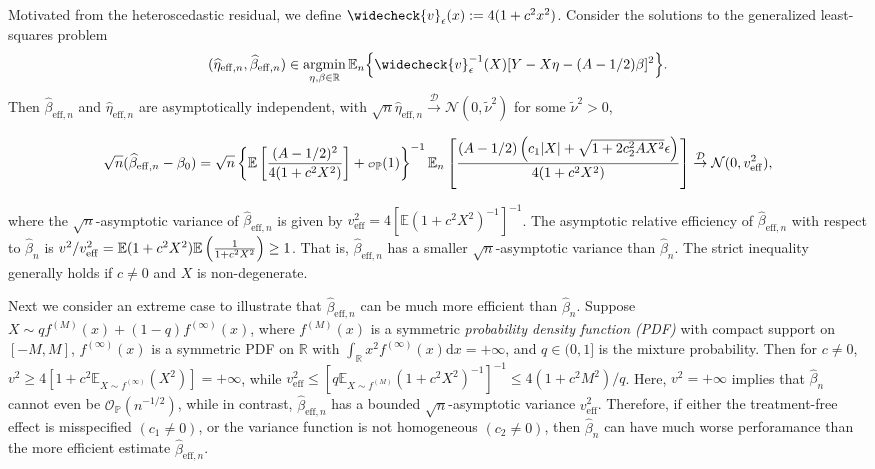 \documentclass[11pt]{article}
\theoremstyle{definition}
\theoremstyle{remark}
\newcommand{\bbE}{\mathbb{E}}
\newcommand{\bbP}{\mathbb{P}}
\newcommand{\bbR}{\mathbb{R}}
\newcommand{\cD}{\mathcal{D}}
\newcommand{\cN}{\mathcal{N}}
\newcommand{\cO}{\mathcal{O}}
\newcommand\smallcO{
	\mathchoice
	{{\scriptscriptstyle\mathcal{O}}}%
	{{\scriptscriptstyle\mathcal{O}}}%
	{{\scriptscriptstyle\mathcal{O}}}%
	{\scalebox{.5}{$\scriptscriptstyle\mathcal{O}$}}%
}
\newcommand{\argmin}{\mathop{\mathrm{argmin}}}
\newcommand{\rd}{\mathrm{d}}
\newcommand{\eff}{\mathrm{eff}}
\begin{document}
Motivated from the heteroscedastic residual, we define $ \widecheck{v}_{\epsilon}(x) := 4(1 + c^{2}x^{2}) $. Consider the solutions to the generalized least-squares problem
\begin{align}
	(\widehat{\eta}_{\eff,n},\widehat{\beta}_{\eff,n}) \in \argmin_{\eta,\beta \in \bbR}\bbE_{n}\Big\{ \widecheck{v}_{\epsilon}^{-1}(X)[Y - X\eta - (A-1/2)\beta]^{2}\Big\}.\label{eq:eg_gls}
\end{align}
Then $ \widehat{\beta}_{\eff,n} $ and $ \widehat{\eta}_{\eff,n} $ are asymptotically independent, with $ \sqrt{n}\widehat{\eta}_{\eff,n} \stackrel{\cD}{\to} \cN(0,\widetilde{\nu}^{2}) $ for some $ \widetilde{\nu}^{2} > 0 $,
\begin{small}
	\[ \sqrt{n}(\widehat{\beta}_{\eff,n} - \beta_{0}) = \sqrt{n}\left\{ \bbE\left[ {(A-1/2)^{2} \over 4(1 + c^{2}X^{2})} \right] + \smallcO_{\bbP}(1) \right\}^{-1}\bbE_{n}\left[ {(A-1/2)\left( c_{1}|X| + \sqrt{1+2c_{2}^{2}AX^{2}}\epsilon \right) \over 4(1 + c^{2}X^{2})} \right] \stackrel{\cD}{\to} \cN(0,v_{\eff}^{2}), \]
\end{small}%
where the $ \sqrt{n} $-asymptotic variance of $ \widehat{\beta}_{\eff,n} $ is given by $ v_{\eff}^{2} = 4\left[\bbE(1 + c^{2}X^{2})^{-1}\right]^{-1} $.
The asymptotic relative efficiency of $ \widehat{\beta}_{\eff,n} $ with respect to $ \widehat{\beta}_{n} $ is $ {v^{2}/v_{\eff}^{2}} = \bbE(1+c^{2}X^{2})\bbE\left(  {1 \over 1 + c^{2}X^{2}}  \right) \ge 1 $.
That is, $ \widehat{\beta}_{\eff,n} $ has a smaller $ \sqrt{n} $-asymptotic variance than $ \widehat{\beta}_{n} $. The strict inequality generally holds if $ c \ne 0 $ and $ X $ is non-degenerate. 

Next we consider an extreme case to illustrate that $ \widehat{\beta}_{\eff,n} $ can be much more efficient than $ \widehat{\beta}_{n} $. Suppose $ X \sim qf^{(M)}(x) + (1-q)f^{(\infty)}(x) $, where $ f^{(M)}(x) $ is a symmetric \textit{probability density function (PDF)} with compact support on $ [-M,M] $, $ f^{(\infty)}(x) $ is a symmetric PDF on $ \bbR $ with $ \int_{\bbR} x^{2}f^{(\infty)}(x)\rd x = +\infty $, and $ q \in (0,1] $ is the mixture probability. Then for $ c \ne 0 $, $ v^{2} \ge 4[1+c^{2}\bbE_{X \sim f^{(\infty)}}(X^{2})] = +\infty $, while $ v_{\eff}^{2} \le \left[ q\bbE_{X \sim f^{(M)}}(1+c^{2}X^{2})^{-1} \right]^{-1} \le 4(1 + c^{2}M^{2})/q $. Here, $ v^{2} = +\infty $ implies that $ \widehat{\beta}_{n} $ cannot even be $ \cO_{\bbP}(n^{-1/2}) $, while in contrast, $ \widehat{\beta}_{\eff,n} $ has a bounded $ \sqrt{n} $-asymptotic variance $ v_{\eff}^{2} $. Therefore, if either the treatment-free effect is misspecified $ (c_{1} \ne 0) $, or the variance function is not homogeneous $ (c_{2} \ne 0) $, then $ \widehat{\beta}_{n} $ can have much worse perforamance than the more efficient estimate $ \widehat{\beta}_{\eff,n} $.
\end{document}
